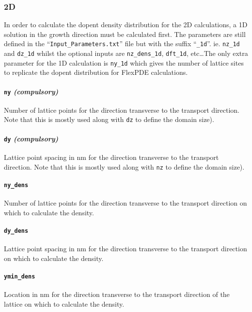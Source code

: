 \documentclass[12pt]{article}
\begin{document}
\subsubsection{2D}

In order to calculate the dopent density distribution for the 2D calculations, a 1D
solution in the growth direction must be calculated first.  The parameters are still
defined in the ``\texttt{Input\_Parameters.txt}'' file but with the suffix ``\texttt{\_1d}''.
ie. \texttt{nz\_1d} and \texttt{dz\_1d} whilst the optional inputs are \texttt{nz\_dens\_1d},
\texttt{dft\_1d}, etc\ldots  The only extra parameter for the 1D calculation is
\texttt{ny\_1d} which gives the number of lattice sites to replicate the dopent distribution
for FlexPDE calculations.

\paragraph{\texttt{ny} \emph{(compulsory)}}
Number of lattice points for the direction transverse to the transport direction.  Note
that this is mostly used along with \texttt{dz} to define the domain size).

\paragraph{\texttt{dy} \emph{(compulsory)}}
Lattice point spacing in nm for the direction transverse to the transport direction.
Note that this is mostly used along with \texttt{nz} to define the domain size).

\paragraph{\texttt{ny\_dens}}
Number of lattice points for the direction transverse to the transport direction on which
to calculate the density.

\paragraph{\texttt{dy\_dens}}
Lattice point spacing in nm for the direction transverse to the transport direction on
which to calculate the density.

\paragraph{\texttt{ymin\_dens}}
Location in nm for the direction transverse to the transport direction of the lattice on
which to calculate the density.
\end{document}
